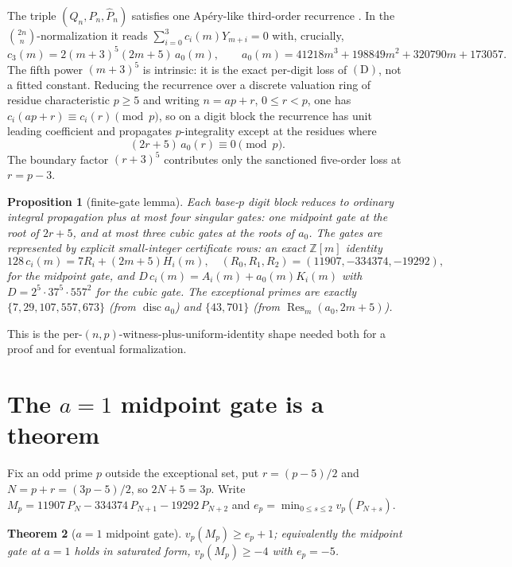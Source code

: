 \documentclass[11pt]{article}
\newtheorem{theorem}{Theorem}
\newtheorem{proposition}[theorem]{Proposition}
\theoremstyle{definition}
\DeclareMathOperator{\disc}{disc}
\DeclareMathOperator{\Res}{Res}
\newcommand{\Z}{\mathbb{Z}}
\newcommand{\bin}[2]{\binom{#1}{#2}}
\newcommand{\Ph}{\widehat{P}}
\newcommand{\vp}{v_p}
\begin{document}
The triple $(Q_n, P_n, \Ph_n)$ satisfies one Ap\'ery-like third-order
recurrence \cite{Zu02}. In the $\bin{2n}n$-normalization it reads
$\sum_{i=0}^3 c_i(m) Y_{m+i} = 0$ with, crucially,
\begin{equation}\label{eq:c3}
c_3(m) = 2(m+3)^5(2m+5)\,a_0(m), \qquad
a_0(m) = 41218 m^3 + 198849 m^2 + 320790 m + 173057.
\end{equation}
The fifth power $(m+3)^5$ is intrinsic: it is the exact per-digit loss of
$(\mathrm D)$, not a fitted constant. Reducing the recurrence over a discrete
valuation ring of residue characteristic $p \ge 5$ and writing $n = ap+r$,
$0 \le r < p$, one has $c_i(ap+r) \equiv c_i(r) \pmod p$, so on a digit block
the recurrence has unit leading coefficient and propagates $p$-integrality
except at the residues where
\[
(2r+5)\,a_0(r) \equiv 0 \pmod p.
\]
The boundary factor $(r+3)^5$ contributes only the sanctioned five-order loss
at $r = p-3$.

\begin{proposition}[finite-gate lemma]\label{prop:gates}
Each base-$p$ digit block reduces to ordinary integral propagation plus at
most four \emph{singular gates}: one \emph{midpoint} gate at the root of
$2r+5$, and at most three \emph{cubic} gates at the roots of $a_0$. The
gates are represented by explicit small-integer certificate rows: an exact
$\Z[m]$ identity
\[
128\,c_i(m) = 7 R_i + (2m+5)H_i(m), \quad (R_0,R_1,R_2) = (11907,-334374,-19292),
\]
for the midpoint gate, and $D\,c_i(m) = A_i(m) + a_0(m)K_i(m)$ with
$D = 2^5\cdot 37^5\cdot 557^2$ for the cubic gate. The exceptional primes are
exactly $\{7,29,107,557,673\}$ (from $\disc a_0$) and $\{43,701\}$ (from
$\Res_m(a_0, 2m+5)$).
\end{proposition}

This is the per-$(n,p)$-witness-plus-uniform-identity shape needed both for a
proof and for eventual formalization.

\section{The $a=1$ midpoint gate is a theorem}

Fix an odd prime $p$ outside the exceptional set, put $r = (p-5)/2$ and
$N = p + r = (3p-5)/2$, so $2N+5 = 3p$. Write
$M_p = 11907\,P_N - 334374\,P_{N+1} - 19292\,P_{N+2}$ and
$e_p = \min_{0\le s\le 2}\vp(P_{N+s})$.

\begin{theorem}[$a=1$ midpoint gate]\label{thm:mid}
$\vp(M_p) \ge e_p + 1$; equivalently the midpoint gate at $a=1$ holds in
saturated form, $\vp(M_p) \ge -4$ with $e_p = -5$.
\end{theorem}
\end{document}
